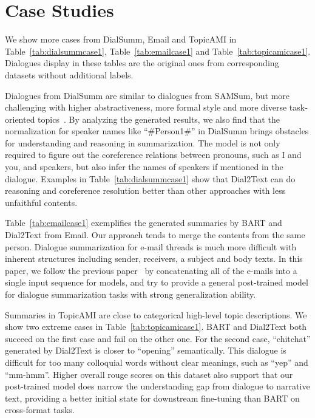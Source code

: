 \documentclass[letterpaper]{article} %
\begin{document}
\section{Case Studies}

We show more cases from DialSumm, Email and TopicAMI in Table~\ref{tab:dialsummcase1}, Table~\ref{tab:emailcase1} and Table~\ref{tab:topicamicase1}. Dialogues display in these tables are the original ones from corresponding datasets without additional labels.

Dialogues from DialSumm are similar to dialogues from SAMSum, but more challenging with higher abstractiveness, more formal style and more diverse task-oriented topics~\cite{chen2021dialsumm}. By analyzing the generated results, we also find that the normalization for speaker names like ``\#Person1\#'' in DialSumm brings obstacles for understanding and reasoning in summarization. The model is not only required to figure out the coreference relations between pronouns, such as I and you, and speakers, but also infer the names of speakers if mentioned in the dialogue. Examples in Table~\ref{tab:dialsummcase1} show that Dial2Text can do reasoning and coreference resolution better than other approaches with less unfaithful contents.

Table~\ref{tab:emailcase1} exemplifies the generated summaries by BART and Dial2Text from Email. Our approach tends to merge the contents from the same person.  Dialogue summarization for e-mail threads is much more difficult with inherent structures including sender, receivers, a subject and body texts. In this paper, we follow the previous paper~\cite{fabbri2021convosumm} by concatenating all of the e-mails into a single input sequence for models, and try to provide a general post-trained model for dialogue summarization tasks with strong generalization ability.

Summaries in TopicAMI are close to categorical high-level topic descriptions. We show two extreme cases in Table~\ref{tab:topicamicase1}. BART and Dial2Text both succeed on the first case and fail on the other one. For the second case, ``chitchat'' generated by Dial2Text is closer to ``opening'' semantically. This dialogue is difficult for too many colloquial words without clear meanings, such as ``yep'' and ``mm-hmm''. Higher overall rouge scores on this dataset also support that our post-trained model does narrow the understanding gap from dialogue to narrative text, providing a better initial state for downstream fine-tuning than BART on cross-format tasks.
\end{document}
